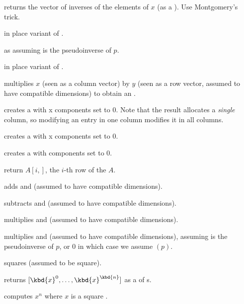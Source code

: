  returns the vector of inverses of the
elements of $x$ (as a ). Use Montgomery's trick.

 in place variant of .

 as 
assuming  is the pseudoinverse of $p$.

 in place variant of
.

 multiplies $x$
(seen as a column vector) by $y$ (seen as a row vector,
assumed to have compatible dimensions) to obtain an .

 creates a  with  x 
components set to $0$. Note that the result allocates a
\emph{single} column, so modifying an entry in one column modifies it in
all columns.

 creates a  with  x
 components set to $0$.

 creates a  with  components set to
$0$.

 return $A[i,]$, the $i$-th row of the
 $A$.

 adds  and 
(assumed to have compatible dimensions).

 subtracts  and 
(assumed to have compatible dimensions).

 multiplies   and 
(assumed to have compatible dimensions).

 multiplies   and
 (assumed to have compatible dimensions), assuming  is the
pseudoinverse of $p$, or $0$ in which case we assume $(p)$.

 squares 
(assumed to be square).

 returns
$[\kbd{x}^0, \dots, \kbd{x}^\kbd{n}]$ as a  of s.

 computes $x^n$ where $x$ is a
square .

